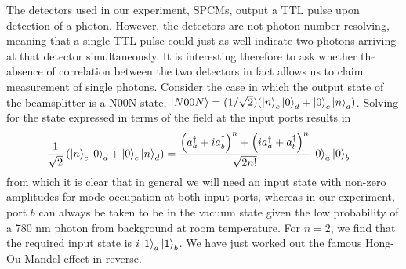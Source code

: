 The detectors used in our experiment, SPCMs, output a TTL pulse upon detection of a photon. However, the detectors are not photon number resolving, meaning that a single TTL pulse could just as well indicate two photons arriving at that detector simultaneously. It is interesting therefore to ask whether the absence of correlation between the two detectors in fact allows us to claim measurement of single photons. Consider the case in which the output state of the beamsplitter is a N00N state, $\ket{N00N} = (1/\sqrt{2})(\ket{n}_c\ket{0}_d + \ket{0}_c\ket{n}_d)$. Solving for the state expressed in terms of the field at the input ports results in
\begin{equation}
    \begin{aligned}
        \frac{1}{\sqrt{2}}\left(\ket{n}_c\ket{0}_d+\ket{0}_c\ket{n}_d\right) &= \frac{\left(a_a^{\dagger} + i a_b^{\dagger}\right)^n + \left(i a_a^{\dagger} + a_b^{\dagger}\right)^n}{\sqrt{2 n!}}\ket{0}_a\ket{0}_b
    \end{aligned}
\end{equation}
from which it is clear that in general we will need an input state with non-zero amplitudes for mode occupation at both input ports, whereas in our experiment, port $b$ can always be taken to be in the vacuum state given the low probability of a 780 nm photon from background at room temperature.
For $n=2$, we find that the required input state is $i\ket{1}_a\ket{1}_b$. We have just worked out the famous Hong-Ou-Mandel effect\cite{Hong1987} in reverse.




